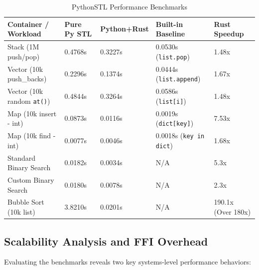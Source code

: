\documentclass[11pt,a4paper]{article}
\begin{document}
\begin{table}[h!]
\centering
\begin{tabular}{@{}lllll@{}}
\toprule
\textbf{Container / Workload} & \textbf{Pure Py STL} & \textbf{Python+Rust} & \textbf{Built-in Baseline} & \textbf{Rust Speedup} \\ \midrule
Stack (1M push/pop) & 0.4768s & 0.3227s & 0.0530s (\texttt{list.pop}) & 1.48x \\
Vector (10k push\_backs) & 0.2296s & 0.1374s & 0.0444s (\texttt{list.append}) & 1.67x \\
Vector (10k random \texttt{at()}) & 0.4844s & 0.3264s & 0.0586s (\texttt{list[i]}) & 1.48x \\
Map (10k insert - int) & 0.0873s & 0.0116s & 0.0019s (\texttt{dict[key]}) & 7.53x \\
Map (10k find - int) & 0.0077s & 0.0046s & 0.0018s (\texttt{key in dict}) & 1.68x \\
Standard Binary Search & 0.0182s & 0.0034s & N/A & 5.3x \\
Custom Binary Search & 0.0180s & 0.0078s & N/A & 2.3x \\ 
Bubble Sort (10k list) & 3.8210s & 0.0201s & N/A & 190.1x (Over 180x) \\ \bottomrule
\end{tabular}
\caption{PythonSTL Performance Benchmarks}
\end{table}

\subsection{Scalability Analysis and FFI Overhead}
Evaluating the benchmarks reveals two key systems-level performance behaviors:
\end{document}

